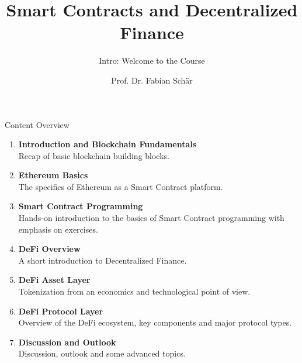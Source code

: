 \documentclass[handout]{beamer}
\title{Smart Contracts and Decentralized Finance}
\subtitle{Intro: Welcome to the Course}
\author{Prof. Dr. Fabian Schär}
\institute{University of Basel}
\begin{document}
\thispagestyle{empty}
\begin{frame}[noframenumbering]
	\titlepage
\end{frame}

\begin{frame}{Content Overview}
\small
\begin{enumerate}
	\item<1-> \textbf{Introduction and Blockchain Fundamentals}\\
		Recap of basic blockchain building blocks.
		\vspace{0.2em}
	\item<2-> \textbf{Ethereum Basics}\\
		The specifics of Ethereum as a Smart Contract platform.
		\vspace{0.2em}
	\item<3-> \textbf{Smart Contract Programming}\\
		Hands-on introduction to the basics of Smart Contract programming with emphasis on exercises.		
	\item<4-> \textbf{DeFi Overview}\\
		A short introduction to Decentralized Finance.
		\vspace{0.2em}
	\item<5-> \textbf{DeFi Asset Layer}\\
		Tokenization from an economics and technological point of view.
		\vspace{0.2em}
	\item<6-> \textbf{DeFi Protocol Layer}\\
			Overview of the DeFi ecosystem, key components and major protocol types.
	\item<7-> \textbf{Discussion and Outlook}\\
			Discussion, outlook and some advanced topics.
\end{enumerate}

\end{frame}
\end{document}
